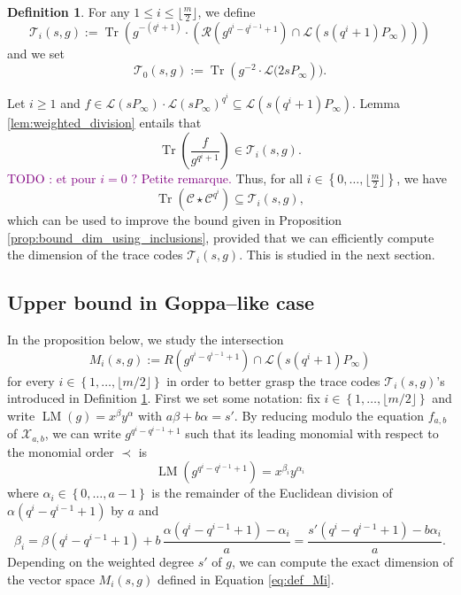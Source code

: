 \documentclass[a4paper]{amsart}
\theoremstyle{definition}
\newtheorem{definition}[thm]{Definition}
\theoremstyle{remark}
\newcommand{\calL}{\mathcal{L}}
\newcommand{\calC}{\mathcal{C}}
\newcommand{\calR}{\mathcal{R}}
\newcommand{\calT}{\mathcal{T}}
\newcommand{\calX}{\mathcal{X}}
\newcommand{\Tr}[1]{\operatorname{Tr}\left(#1\right)}
\newcommand{\set}[1]{\left\{#1\right\}}
\newcommand{\LM}[1]{\operatorname{LM}\left(#1\right)}
\newcommand\jade[1]{\textcolor{purple}{#1}}
\begin{document}
\begin{definition} \label{def:T_i's}
For any $1 \leq i \leq \lfloor\frac{m}{2}\rfloor$, we define
$$\calT_i(s,g):= \Tr{g^{-(q^i+1)}\cdot \left( \calR\left(g^{q^i-q^{i-1}+1}\right)  \cap \calL(s(q^i+1)P_\infty)\right)}$$
and we set $$\calT_0(s,g) := \Tr{g^{-2} \cdot \calL(2sP_\infty}).$$
\end{definition}

\noindent Let $i \geq 1$ and $f \in \calL(sP_\infty) \cdot \calL(sP_\infty)^{q^i} \subseteq \calL(s(q^i+1)P_\infty)$. Lemma \ref{lem:weighted_division} entails that 
$$\Tr{\dfrac{f}{g^{q^i+1}}} \in \calT_i(s,g).$$
\jade{TODO : et pour $i=0$ ? Petite remarque.}
Thus, for all $i \in \set{0,\dots,\lfloor \frac{m}{2} \rfloor}$, we have \begin{equation} \label{eq:Tr(C*C^q^i)_dans_T_i}
\Tr{\calC \star \calC^{q^i}} \subseteq \calT_i(s,g),
\end{equation}
which can be used to improve the bound given in Proposition \ref{prop:bound_dim_using_inclusions}, provided that we can efficiently compute the dimension of the trace codes $\calT_i(s,g)$. This is studied in the next section.
\subsection{Upper bound in Goppa--like case}
In the proposition below, we study the intersection 
\begin{equation}\label{eq:def_Mi}
M_i(s,g):=R\left(g^{q^{i}-q^{i-1}+1}\right) \cap \calL(s(q^i+1)P_\infty)
\end{equation}
for every $i \in \set{1,\dots,\lfloor m/2 \rfloor}$ in order to better grasp the trace codes $\calT_i(s,g)$'s introduced in Definition \ref{def:T_i's}.
First we set some notation: fix $i \in \set{1,\dots,\lfloor m/2 \rfloor}$ and write $\LM{g}=x^\beta y^\alpha$ with $a\beta + b\alpha=s'$. By reducing modulo the equation $f_{a,b}$ of $\calX_{a,b}$, we can write $g^{q^i-q^{i-1}+1}$ such that its leading monomial with respect to the monomial order $\prec$ is
\begin{equation}\label{eq:gi}
 \LM{g^{q^i-q^{i-1}+1}}=x^{\beta_i} y^{\alpha_i}
\end{equation}
 where $\alpha_i \in \set{0,\dots,a-1}$ is the remainder of the Euclidean division of $\alpha (q^i-q^{i-1}+1)$ by $a$ and 
 \begin{equation}\label{eq:value_beta_prime}
  \beta_i=\beta(q^i-q^{i-1}+1) + b \, \frac{\alpha(q^i-q^{i-1}+1)-\alpha_i}{a}= \frac{s'(q^i-q^{i-1}+1)-b\alpha_i}{a}.
 \end{equation}
%
Depending on the weighted degree $s'$ of $g$, we can compute the exact dimension of the vector space $M_i(s,g)$ defined in Equation \eqref{eq:def_Mi}.
\end{document}
